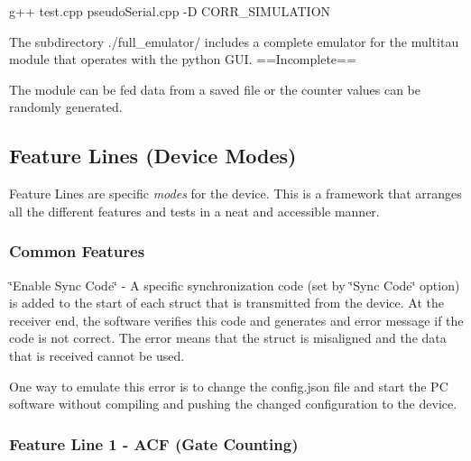 \begin{DoxyCode}
g++ test.cpp pseudoSerial.cpp -D CORR\_SIMULATION
\end{DoxyCode}



\begin{DoxyItemize}
\item The subdirectory {\ttfamily ./full\+\_\+emulator}/ includes a complete emulator for the multitau module that operates with the python G\+UI. ==Incomplete==
\begin{DoxyItemize}
\item The module can be fed data from a saved file or the counter values can be randomly generated.
\end{DoxyItemize}
\end{DoxyItemize}

\subsection*{Feature Lines (Device Modes)}

Feature Lines are specific {\itshape modes} for the device. This is a framework that arranges all the different features and tests in a neat and accessible manner.

\subsubsection*{Common Features}


\begin{DoxyItemize}
\item {\ttfamily \char`\"{}\+Enable Sync Code\char`\"{}} -\/ A specific synchronization code (set by {\ttfamily \char`\"{}\+Sync Code\char`\"{}} option) is added to the start of each struct that is transmitted from the device. At the receiver end, the software verifies this code and generates and error message if the code is not correct. The error means that the struct is misaligned and the data that is received cannot be used.

One way to emulate this error is to change the {\ttfamily config.\+json} file and start the PC software without compiling and pushing the changed configuration to the device.
\end{DoxyItemize}

\subsubsection*{Feature Line 1 -\/ {\ttfamily A\+CF} (Gate Counting)}

